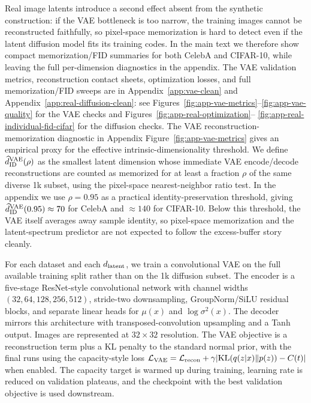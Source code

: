 Real image latents introduce a second effect absent from the synthetic construction: if the VAE bottleneck is too narrow, the training images cannot be reconstructed faithfully, so pixel-space memorization is hard to detect even if the latent diffusion model fits its training codes. In the main text we therefore show compact memorization/FID summaries for both CelebA and CIFAR-10, while leaving the full per-dimension diagnostics in the appendix. The VAE validation metrics, reconstruction contact sheets, optimization losses, and full memorization/FID sweeps are in Appendix~\ref{app:vae-clean} and Appendix~\ref{app:real-diffusion-clean}: see Figures~\ref{fig:app-vae-metrics}--\ref{fig:app-vae-quality} for the VAE checks and Figures~\ref{fig:app-real-optimization}-- \ref{fig:app-real-individual-fid-cifar} for the diffusion checks. The VAE reconstruction-memorization diagnostic in Appendix Figure~\ref{fig:app-vae-metrics} gives an empirical proxy for the effective intrinsic-dimensionality threshold. We define $\widehat d_{\rm ID}^{\rm VAE}(\rho)$ as the smallest latent dimension whose immediate VAE encode/decode reconstructions are counted as memorized for at least a fraction $\rho$ of the same diverse 1k subset, using the pixel-space nearest-neighbor ratio test. In the appendix we use $\rho=0.95$ as a practical identity-preservation threshold, giving $\widehat d_{\rm ID}^{\rm VAE}(0.95) \approx 70$ for CelebA and $\approx 140$ for CIFAR-10. Below this threshold, the VAE itself averages away sample identity, so pixel-space memorization and the latent-spectrum predictor are not expected to follow the excess-buffer story cleanly.

For each dataset and each $d_{\mathrm{latent}}$, we train a convolutional VAE on the full available training split rather than on the 1k diffusion subset. The encoder is a five-stage ResNet-style convolutional network with channel widths $(32,64,128,256,512)$, stride-two downsampling, GroupNorm/SiLU residual blocks, and separate linear heads for $\mu(x)$ and $\log\sigma^2(x)$. The decoder mirrors this architecture with transposed-convolution upsampling and a Tanh output. Images are represented at $32\times 32$ resolution. The VAE objective is a reconstruction term plus a KL penalty to the standard normal prior, with the final runs using the capacity-style loss $\mathcal L_{\rm VAE}=\mathcal L_{\rm recon} + \gamma |\mathrm{KL}(q(z|x)\|p(z))-C(t)|$ when enabled. The capacity target is warmed up during training, learning rate is reduced on validation plateaus, and the checkpoint with the best validation objective is used downstream.

